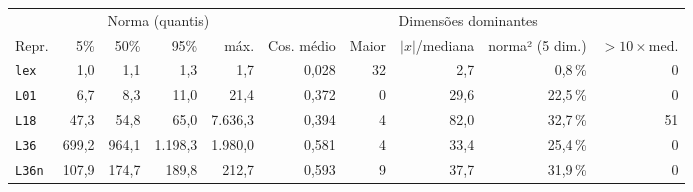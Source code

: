 \footnotesize
\setlength{\tabcolsep}{4pt}
\begin{tabular}{lrrrrrrrrr}
\toprule
 & \multicolumn{4}{c}{Norma (quantis)} &  & \multicolumn{3}{c}{Dimensões dominantes} &  \\
\cmidrule(lr){2-5}\cmidrule(lr){7-9}
Repr. & 5\% & 50\% & 95\% & máx. & Cos. médio & Maior & $|x|$/mediana & norma² (5 dim.) & $>10\times$med. \\
\midrule
\texttt{lex} & 1,0 & 1,1 & 1,3 & 1,7 & 0,028 & 32 & 2,7 & 0,8\,\% & 0 \\
\texttt{L01} & 6,7 & 8,3 & 11,0 & 21,4 & 0,372 & 0 & 29,6 & 22,5\,\% & 0 \\
\texttt{L18} & 47,3 & 54,8 & 65,0 & 7.636,3 & 0,394 & 4 & 82,0 & 32,7\,\% & 51 \\
\texttt{L36} & 699,2 & 964,1 & 1.198,3 & 1.980,0 & 0,581 & 4 & 33,4 & 25,4\,\% & 0 \\
\texttt{L36n} & 107,9 & 174,7 & 189,8 & 212,7 & 0,593 & 9 & 37,7 & 31,9\,\% & 0 \\
\bottomrule
\end{tabular}

\par{}
